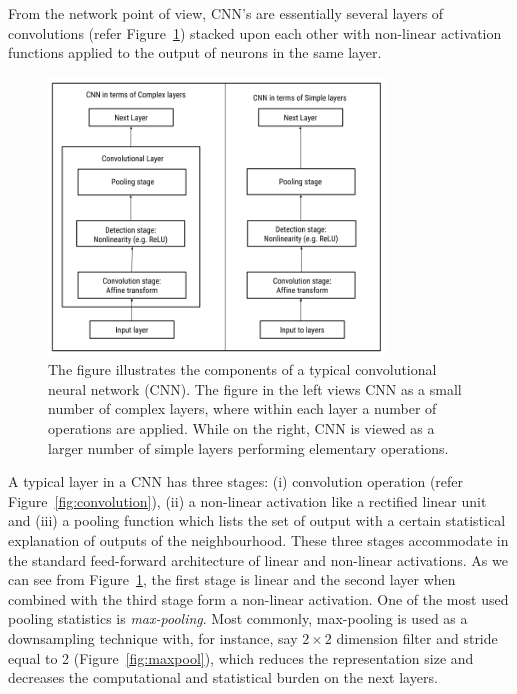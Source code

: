 From the network point of view, CNN's are essentially several layers of convolutions (refer Figure~\ref{fig:CNN_layer}) stacked upon each other with non-linear activation functions applied to the output of neurons in the same layer. 
\begin{figure}[!htb]
    \includegraphics[width=0.8\textwidth, center]{Figures/cnn.png}
    \caption{The figure illustrates the components of a typical convolutional neural network (CNN). The figure in the left views CNN as a small number of complex layers, where within each layer a number of operations are applied. While on the right, CNN is viewed as a larger number of simple layers performing elementary operations.}
    \label{fig:CNN_layer}
\end{figure}
A typical layer in a CNN has three stages: (i) convolution operation (refer Figure~\ref{fig:convolution}), (ii) a non-linear activation like a rectified linear unit and (iii) a pooling function which lists the set of output with a certain statistical explanation of outputs of the neighbourhood. These three stages accommodate in the standard feed-forward architecture of linear and non-linear activations. As we can see from Figure~\ref{fig:CNN_layer},
the first stage is linear and the second layer when combined with the third stage form a non-linear activation. 
One of the most used pooling statistics is \emph{max-pooling}. Most commonly, max-pooling is used as a downsampling technique with, for instance, say $2 \times 2$ dimension filter and stride equal to 2 (Figure~\ref{fig:maxpool}), which reduces the representation size and decreases the computational and statistical burden on the next layers.



